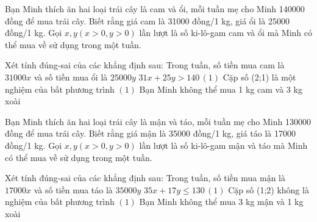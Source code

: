 \begin{ex}
 Bạn Minh thích ăn hai loại trái cây là cam và ổi, mỗi tuần mẹ cho Minh 140000 đồng để mua trái cây. Biết rằng giá cam là 31000 đồng/1 kg, giá ổi là 25000 đồng/1 kg. Gọi $x, y (x>0, y>0)$ lần lượt là số ki-lô-gam cam và ổi mà Minh có thể mua về sử dụng trong một tuần.

 Xét tính đúng-sai của các khẳng định sau:
\choiceTFt
{ \True Trong tuần, số tiền mua cam là ${31000x}$ và số tiền mua ổi là ${25000y}$ }
   { $31 x + 25 y>140 \, (1)$ }
     { \True  Cặp số (2;1) là một nghiệm của bất phương trình $(1)$ }
    { Bạn Minh không thể mua 1 kg cam và 3 kg xoài }
\end{ex}

\begin{ex}
 Bạn Minh thích ăn hai loại trái cây là mận và táo, mỗi tuần mẹ cho Minh 130000 đồng để mua trái cây. Biết rằng giá mận là 35000 đồng/1 kg, giá táo là 17000 đồng/1 kg. Gọi $x, y (x>0, y>0)$ lần lượt là số ki-lô-gam mận và táo mà Minh có thể mua về sử dụng trong một tuần.

 Xét tính đúng-sai của các khẳng định sau:
\choiceTFt
{ Trong tuần, số tiền mua mận là ${17000x}$ và số tiền mua táo là ${35000y}$ }
   { \True $35 x + 17 y\le 130 \, (1)$ }
     { Cặp số (1;2) không là nghiệm của bất phương trình $(1)$ }
    { Bạn Minh không thể mua 3 kg mận và 1 kg xoài }
\end{ex}

